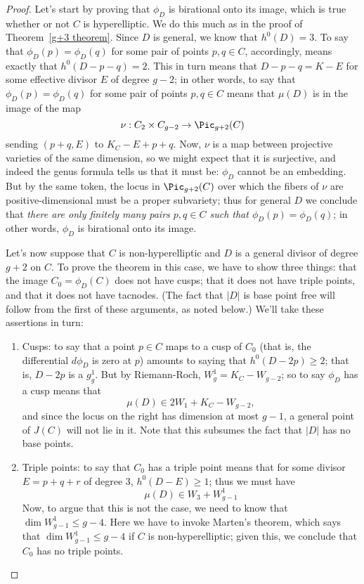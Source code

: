 \begin{proof}
Let's start by proving that $\phi_D$ is birational onto its image, which is true whether or not $C$ is hyperelliptic. We do this much as in the proof of Theorem~\ref{g+3 theorem}. Since $D$ is general, we know that $h^0(D) = 3$. To say that $\phi_D(p) = \phi_D(q)$ for some pair of points $p, q \in C$, accordingly, means exactly that $h^0(D-p-q) = 2$. This in turn means that $D-p-q = K-E$ for some effective divisor $E$ of degree $g-2$; in other words, to say that $\phi_D(p) = \phi_D(q)$ for some pair of points $p, q \in C$ means that $\mu(D)$ is in the image of the map
$$
\nu : C_2 \times C_{g-2} \to \Pic_{g+2}(C)
$$
sending $(p+q, E)$ to $K_C - E + p + q$. Now, $\nu$ is a map between projective varieties of the same dimension, so we might expect that it is surjective, and indeed the genus formula tells us that it must be: $\phi_D$ cannot be an embedding. But by the same token, the locus in $\Pic_{g+2}(C)$ over which the fibers of $\nu$ are positive-dimensional must be a proper subvariety; thus for general $D$ we conclude that \emph{there are only finitely many pairs $p, q \in C$ such that $\phi_D(p) = \phi_D(q)$}; in other words, $\phi_D$ is birational onto its image.

Let's now suppose that $C$ is non-hyperelliptic and $D$ is a general divisor of degree $g+2$ on $C$. To prove the theorem in this case, we have to show  three things: that the image $C_0 = \phi_D(C)$ does not have cusps; that it does not have triple points, and that it does not have tacnodes. (The fact that $|D|$ is base point free  will follow from the first of these arguments, as noted below.) We'll take these assertions in turn:

\begin{enumerate}


\item Cusps: to say that a point $p \in C$ maps to a cusp of $C_0$ (that is, the differential $d\phi_D$ is zero at $p$) amounts to saying that $h^0(D-2p) \geq 2$; that is, $D-2p$ is a $g^1_g$. But by Riemann-Roch, $W^1_g = K_C - W_{g-2}$; so to say $\phi_D$ has a cusp means that
$$
\mu(D) \in 2W_1 + K_C - W_{g-2},
$$
and since the locus on the right has dimension at most $g-1$, a general point of $J(C)$ will not lie in it. Note that this subsumes the fact that $|D|$ has no base points.

\item Triple points: to say that $C_0$ has a triple point means that for some divisor $E = p+q+r$ of degree 3, $h^0(D-E) \geq 1$; thus we must have 
$$
\mu(D) \in W_3 + W^1_{g-1}
$$
Now, to argue that this is not the case, we need to know that $\dim W^1_{g-1} \leq g-4$. Here we have to invoke Marten's theorem, which says that $\dim W^1_{g-1} \leq g-4$ if $C$ is non-hyperelliptic; given this, we conclude that $C_0$ has no triple points.


\end{enumerate}
\end{proof}

